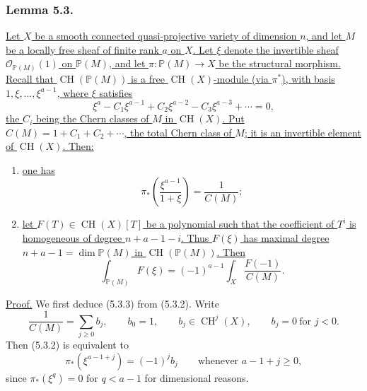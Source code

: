 \subsubsection*{Lemma 5.3.}
\underline{Let $X$ be a smooth connected quasi-projective variety of
dimension $n$, and let $M$ be a locally free sheaf of finite rank $a$
on $X$.  Let $\xi$ denote the invertible sheaf
$\mathcal O_{\mathbb P(M)}(1)$ on $\mathbb P(M)$, and let
$\pi:\mathbb P(M)\to X$ be the structural morphism.  Recall that
$\operatorname{CH}(\mathbb P(M))$ is a free
$\operatorname{CH}(X)$-module (via $\pi^*$), with basis
$1,\xi,\ldots,\xi^{a-1}$, where $\xi$ satisfies}
\begin{equation}\tag{5.3.1}
\xi^a-C_1\xi^{a-1}+C_2\xi^{a-2}-C_3\xi^{a-3}+\cdots=0,
\end{equation}
\underline{the $C_i$ being the Chern classes of $M$ in
$\operatorname{CH}(X)$.  Put
$C(M)=1+C_1+C_2+\cdots$, the total Chern class of $M$; it is an
invertible element of $\operatorname{CH}(X)$.  Then:}

\begin{enumerate}
\item[(i)] \underline{one has}
\begin{equation}\tag{5.3.2}
\pi_*\!\left(\frac{\xi^{a-1}}{1+\xi}\right)
=\frac{1}{C(M)};
\end{equation}
\item[(ii)] \underline{let
$F(T)\in\operatorname{CH}(X)[T]$ be a polynomial such that the
coefficient of $T^i$ is homogeneous of degree $n+a-1-i$.  Thus
$F(\xi)$ has maximal degree
$n+a-1=\dim\mathbb P(M)$ in
$\operatorname{CH}(\mathbb P(M))$.  Then}
\begin{equation}\tag{5.3.3}
\int_{\mathbb P(M)}F(\xi)
=(-1)^{a-1}\int_X\frac{F(-1)}{C(M)}.
\end{equation}
\end{enumerate}

\noindent\underline{Proof.}
We first deduce (5.3.3) from (5.3.2).  Write
\begin{equation}\tag{5.3.4}
\frac{1}{C(M)}=\sum_{j\geq0}b_j,\qquad
b_0=1,\qquad
b_j\in\operatorname{CH}^j(X),\qquad
b_j=0\ \text{for }j<0.
\end{equation}
Then (5.3.2) is equivalent to
\begin{equation}\tag{5.3.5}
\pi_*(\xi^{a-1+j})=(-1)^jb_j
\qquad\text{whenever }a-1+j\geq0,
\end{equation}
since $\pi_*(\xi^q)=0$ for $q<a-1$ for dimensional reasons.

